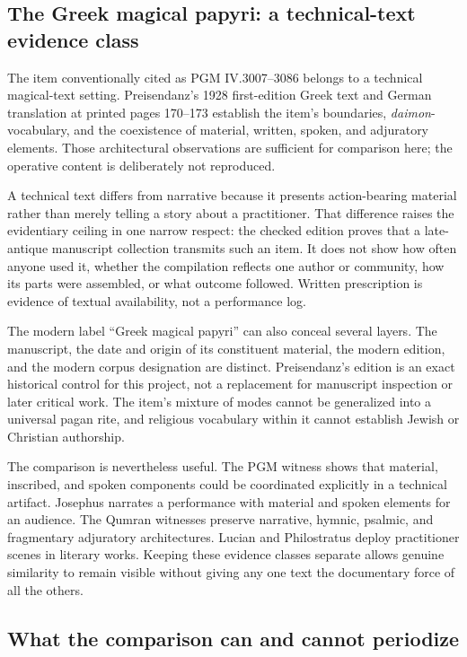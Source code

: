 \subsection{The Greek magical papyri: a technical-text evidence class}

The item conventionally cited as PGM IV.3007--3086 belongs to a technical
magical-text setting. Preisendanz's 1928 first-edition Greek text and German
translation at printed pages 170--173 establish the item's boundaries,
\emph{daimon}-vocabulary, and the coexistence of material, written, spoken,
and adjuratory elements. Those architectural observations are sufficient for
comparison here; the operative content is deliberately not reproduced.

A technical text differs from narrative because it presents action-bearing
material rather than merely telling a story about a practitioner. That
difference raises the evidentiary ceiling in one narrow respect: the checked
edition proves that a late-antique manuscript collection transmits such an
item. It does not show how often anyone used it, whether the compilation
reflects one author or community, how its parts were assembled, or what
outcome followed. Written prescription is evidence of textual availability,
not a performance log.

The modern label ``Greek magical papyri'' can also conceal several layers.
The manuscript, the date and origin of its constituent material, the modern
edition, and the modern corpus designation are distinct. Preisendanz's
edition is an exact historical control for this project, not a replacement
for manuscript inspection or later critical work. The item's mixture of modes
cannot be generalized into a universal pagan rite, and religious vocabulary
within it cannot establish Jewish or Christian authorship.

The comparison is nevertheless useful. The PGM witness shows that material,
inscribed, and spoken components could be coordinated explicitly in a
technical artifact. Josephus narrates a performance with material and spoken
elements for an audience. The Qumran witnesses preserve narrative, hymnic,
psalmic, and fragmentary adjuratory architectures. Lucian and Philostratus
deploy practitioner scenes in literary works. Keeping these evidence classes
separate allows genuine similarity to remain visible without giving any one
text the documentary force of all the others.

\subsection{What the comparison can and cannot periodize}

